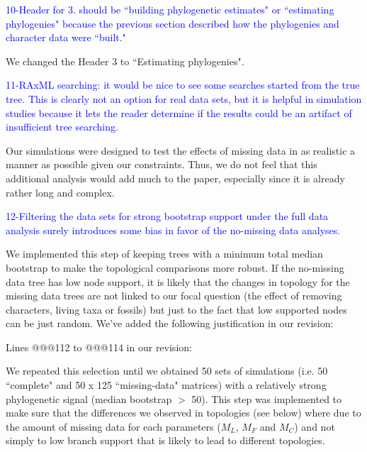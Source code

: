 \documentclass[11pt]{letter}
\begin{document}
\begin{letter}{}

\textcolor{blue}{10-Header for 3. should be ``building phylogenetic estimates" or ``estimating phylogenies" because the previous section described how the phylogenies and character data were ``built."}

We changed the Header 3 to ``Estimating phylogenies".


\textcolor{blue}{11-RAxML searching: it would be nice to see some searches started from the true tree. This is clearly not an option for real data sets, but it is helpful in simulation studies because it lets the reader determine if the results could be an artifact of insufficient tree searching.}

Our simulations were designed to test the effects of missing data in as realistic a manner as possible given our constraints. Thus, we do not feel that this additional analysis would add much to the paper, especially since it is already rather long and complex. 


\textcolor{blue}{12-Filtering the data sets for strong bootstrap support under the full data analysis surely introduces some bias in favor of the no-missing data analyses.}

We implemented this step of keeping trees with a minimum total median bootstrap to make the topological comparisons more robust. If the no-missing data tree has low node support, it is likely that the changes in topology for the missing data trees are not linked to our focal question (the effect of removing characters, living taxa or fossils) but just to the fact that low supported nodes can be just random. We've added the following justification in our revision:


Lines @@@112 to @@@114 in our revision:

\hfill\begin{minipage}{\dimexpr\textwidth-1cm}
We repeated this selection until we obtained 50 sets of simulations (i.e. 50 ``complete" and 50 x 125 ``missing-data" matrices) with a relatively strong phylogenetic signal (median bootstrap $>$ 50). This step was implemented to make sure that the differences we observed in topologies (see below) where due to the amount of missing data for each parameters ($M_L$, $M_F$ and $M_C$) and not simply to low branch support that is likely to lead to different topologies.
\end{minipage}


\end{letter}
\end{document}
